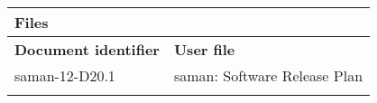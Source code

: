 \small
\begin{tabularx}{\textwidth}{|L|p{11cm}|}
\caption*{\textbf{Files}}\label{tab:files}\\
\toprule
\textbf{Document identifier} & \textbf{User file}\\
\midrule
saman-12-D20.1 & saman: Software Release Plan\\
\midrule
& \\
\bottomrule
\end{tabularx}